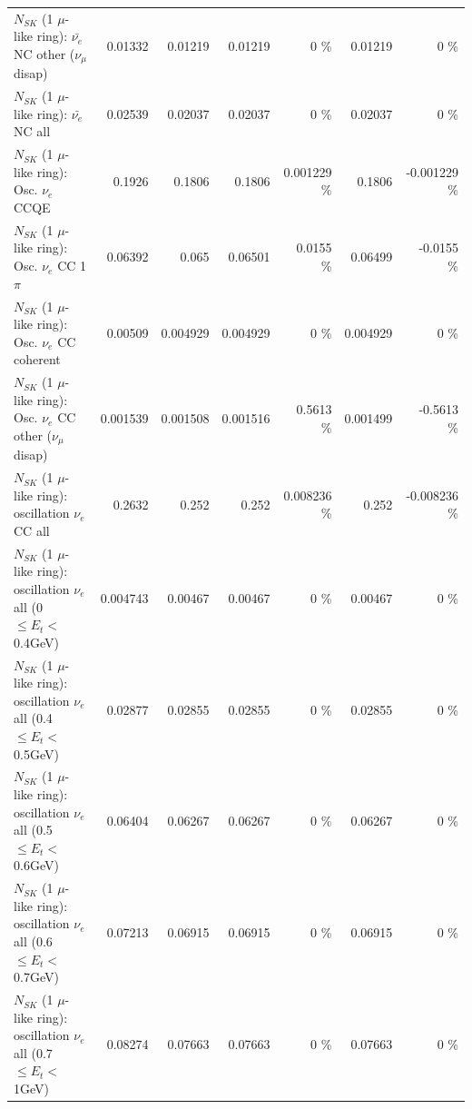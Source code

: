 \begin{table}
\begin{tabular}{| l | r | r | r  r | r  r |}
          $N_{SK}$ (1 $\mu$-like ring): $\bar{\nu_e}$ NC other ($\nu_\mu$ disap) &         0.01332 &         0.01219 &         0.01219 &        0 \%  &         0.01219 &        0 \%  \\ 
                            $N_{SK}$ (1 $\mu$-like ring): $\bar{\nu_{e}}$ NC all &         0.02539 &         0.02037 &         0.02037 &        0 \%  &         0.02037 &        0 \%  \\ 
\hline
\hline
\hline
                                 $N_{SK}$ (1 $\mu$-like ring): Osc. $\nu_e$ CCQE &          0.1926 &          0.1806 &          0.1806 & 0.001229 \%  &          0.1806 & -0.001229 \%  \\ 
                            $N_{SK}$ (1 $\mu$-like ring): Osc. $\nu_e$ CC 1$\pi$ &         0.06392 &           0.065 &         0.06501 &   0.0155 \%  &         0.06499 &  -0.0155 \%  \\ 
                          $N_{SK}$ (1 $\mu$-like ring): Osc. $\nu_e$ CC coherent &         0.00509 &        0.004929 &        0.004929 &        0 \%  &        0.004929 &        0 \%  \\ 
           $N_{SK}$ (1 $\mu$-like ring): Osc. $\nu_e$ CC other ($\nu_\mu$ disap) &        0.001539 &        0.001508 &        0.001516 &   0.5613 \%  &        0.001499 &  -0.5613 \%  \\ 
                        $N_{SK}$ (1 $\mu$-like ring): oscillation $\nu_e$ CC all &          0.2632 &           0.252 &           0.252 & 0.008236 \%  &           0.252 & -0.008236 \%  \\ 
\hline
$N_{SK}$ (1 $\mu$-like ring): oscillation $\nu_{e}$ all (0 $\leq E_{t} <$ 0.4GeV) &        0.004743 &         0.00467 &         0.00467 &        0 \%  &         0.00467 &        0 \%  \\ 
$N_{SK}$ (1 $\mu$-like ring): oscillation $\nu_{e}$ all (0.4 $\leq E_{t} <$ 0.5GeV) &         0.02877 &         0.02855 &         0.02855 &        0 \%  &         0.02855 &        0 \%  \\ 
$N_{SK}$ (1 $\mu$-like ring): oscillation $\nu_{e}$ all (0.5 $\leq E_{t} <$ 0.6GeV) &         0.06404 &         0.06267 &         0.06267 &        0 \%  &         0.06267 &        0 \%  \\ 
$N_{SK}$ (1 $\mu$-like ring): oscillation $\nu_{e}$ all (0.6 $\leq E_{t} <$ 0.7GeV) &         0.07213 &         0.06915 &         0.06915 &        0 \%  &         0.06915 &        0 \%  \\ 
$N_{SK}$ (1 $\mu$-like ring): oscillation $\nu_{e}$ all (0.7 $\leq E_{t} <$ 1GeV) &         0.08274 &         0.07663 &         0.07663 &        0 \%  &         0.07663 &        0 \%  \\ 

\end{tabular}
\end{table}
